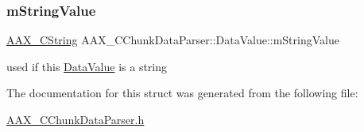 \subsubsection{\texorpdfstring{mStringValue}{mStringValue}}
{\footnotesize\ttfamily \mbox{\hyperlink{a01573}{A\+A\+X\+\_\+\+C\+String}} A\+A\+X\+\_\+\+C\+Chunk\+Data\+Parser\+::\+Data\+Value\+::m\+String\+Value}



used if this \mbox{\hyperlink{a01465}{Data\+Value}} is a string 



The documentation for this struct was generated from the following file\+:\begin{DoxyCompactItemize}
\item 
\mbox{\hyperlink{a00416}{A\+A\+X\+\_\+\+C\+Chunk\+Data\+Parser.\+h}}\end{DoxyCompactItemize}

